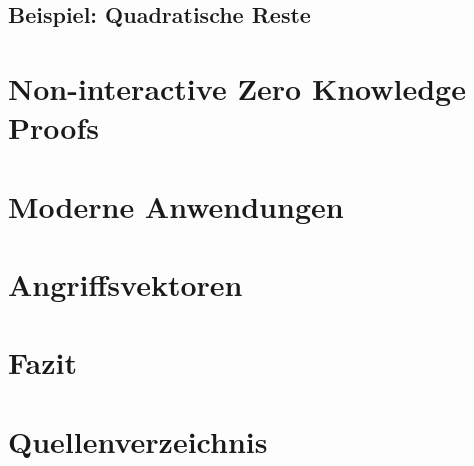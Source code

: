 \documentclass {article}
\begin{document}
\subsection{Beispiel: Quadratische Reste}
\section{Non-interactive Zero Knowledge Proofs}
\section{Moderne Anwendungen}
\section{Angriffsvektoren}
\section{Fazit}
\section{Quellenverzeichnis}
\end{document}
